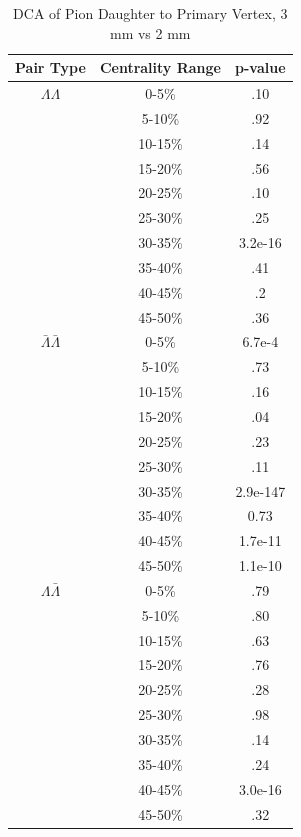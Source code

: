 \begin{table}
\begin{minipage}{18pc}
\caption {DCA of Pion Daughter to Primary Vertex, 3 mm vs 2 mm} \label{tab:DcaPionPvalueTests3mmVs2mm}
\begin{center}
\begin{tabular}{| c | c | c |}
  \hline                       
  Pair Type & Centrality Range & p-value \\
  \hline
  $\Lambda\Lambda$ & 0-5\% & .10 \\
   & 5-10\%  & .92 \\
   & 10-15\% & .14 \\
   & 15-20\% & .56 \\
   & 20-25\% & .10 \\
   & 25-30\% & .25 \\
   & 30-35\% & 3.2e-16 \\
   & 35-40\% & .41 \\
   & 40-45\% & .2 \\
   & 45-50\% & .36 \\
   \hline
  $\bar{\Lambda}\bar{\Lambda}$ &  0-5\% & 6.7e-4 \\
   & 5-10\% & .73 \\
   & 10-15\% & .16 \\
   & 15-20\% & .04 \\
   & 20-25\% & .23 \\
   & 25-30\% & .11 \\
   & 30-35\% & 2.9e-147 \\
   & 35-40\% & 0.73 \\
   & 40-45\% & 1.7e-11 \\
   & 45-50\% &  1.1e-10 \\
   \hline
  $\Lambda\bar{\Lambda}$ &  0-5\% & .79 \\
   & 5-10\% & .80 \\
   & 10-15\% & .63 \\
   & 15-20\% & .76 \\
   & 20-25\% & .28 \\
   & 25-30\% & .98 \\
   & 30-35\% & .14 \\
   & 35-40\% & .24 \\
   & 40-45\% & 3.0e-16 \\
   & 45-50\% & .32 \\
  \hline  
\end{tabular}
\end{center}
\end{minipage}

\end{table}
